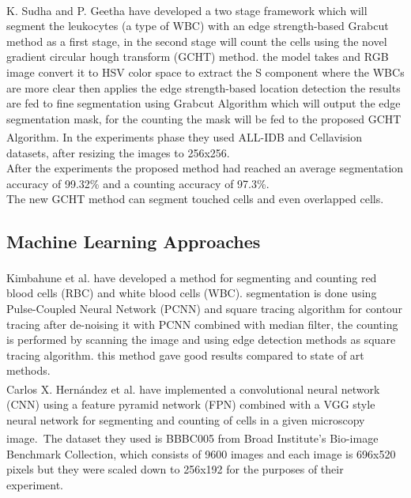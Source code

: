 K. Sudha and P. Geetha \textsuperscript{\cite{SUDHA2020639}} have developed a two stage framework which will segment the leukocytes (a type of WBC) with an edge strength-based Grabcut method as a first stage, in the second stage will count the cells using the novel gradient circular hough transform (GCHT) method. the model takes and RGB image convert it to HSV color space to extract the S component where the WBCs are more clear then applies the edge strength-based location detection the results are fed to fine segmentation using Grabcut Algorithm which will output the edge segmentation mask, for the counting the mask will be fed to the proposed GCHT Algorithm. In the experiments phase they used ALL-IDB \textsuperscript{\cite{labati2011all}} and Cellavision \textsuperscript{\cite{Zheng2018}} datasets, after resizing the images to 256x256.\\
After the experiments the proposed method had reached an average segmentation accuracy of 99.32\% and a counting accuracy of 97.3\%.\\
The new GCHT method can segment touched cells and even overlapped cells.

\subsection{Machine Learning Approaches}
\hspace{\parindent}
Kimbahune et al. \textsuperscript{\cite{kimbahune2011blood}} have developed a method for segmenting and counting red blood cells (RBC) and white blood cells (WBC).
segmentation is done using Pulse-Coupled Neural Network (PCNN) and square tracing algorithm for contour tracing after de-noising it with PCNN combined with median filter, the counting is performed by scanning the image and using edge detection methods as square tracing algorithm. this method gave good results compared to state of art methods.\\

Carlos X. Hern{\'{a}}ndez et al. \textsuperscript{\cite{DBLP:journals/corr/abs-1802-10548}} have implemented a convolutional neural network (CNN) using a feature pyramid network (FPN) combined with a VGG style neural network for segmenting and counting of cells in a given microscopy image.\
The dataset they used is BBBC005 \textsuperscript{\cite{ljosa2012annotated}} from Broad Institute's Bio-image Benchmark Collection, which consists of 9600 images and each image is 696x520 pixels but they were scaled down to 256x192 for the purposes of their experiment.\

